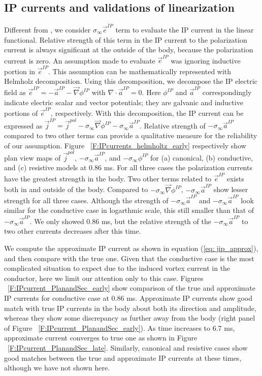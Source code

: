 \documentclass[a4paper, 11pt]{article}
\renewcommand{\div}{\nabla\cdot}
\newcommand{\grad}{\vec \nabla}
\newcommand{\siginf}{\sigma_\infty}
\renewcommand {\j}  { {\vec j} }
\newcommand {\e}  { {\vec e} }
\begin{document}
\subsection{IP currents and validations of linearization}
Different from \cite{Smith1988a}, we consider $\siginf \e^{IP}$ term to evaluate the IP current in the linear functional. Relative strength of this term in the IP current to the polarization current is always significant at the outside of the body, because the polarization current is zero. 
An assumption made to evaluate $\e^{IP}$ was ignoring inductive portion in $\e^{IP}$. 
This assumption can be mathematically represented with Helmholz decomposition. 
Using this decomposition, we decompose the IP electric field as $\e^{IP} = - \vec{a}^{IP} -\grad \phi^{IP}$ with $\div \vec{a}^{IP} = 0$. Here $\phi^{IP}$ and $\vec{a}^{IP}$ correspondingly indicate electric scalar and vector potentials; they are galvanic and inductive portions of $\e^{IP}$, respectively. With this decomposition, the IP current can be expressed as $\j^{IP} = \j^{pol}-\siginf \grad \phi^{IP}-\siginf \vec{a}^{IP}$. Relative strength of $-\siginf \vec{a}^{IP}$ compared to two other terms can provide a qualitative measure for the reliability of our assumption. 
Figure ~\ref{F:IPcurrents_helmholtz_early} respectively show plan view maps of $\j^{pol}$, $-\siginf \vec{a}^{IP}$, and $-\siginf \phi^{IP}$ for (a) canonical, (b) conductive, and (c) resistive models at 0.86 ms.
For all three cases the polarization currents have the greatest strength in the body. 
Two other terms related to $\e^{IP}$ exists both in and outside of the body. 
Compared to $-\siginf \grad\phi^{IP}$, $-\siginf \vec{a}^{IP}$ show lesser strength for all three cases. 
Although the strength of $-\siginf \vec{a}^{IP}$ and  $-\siginf \vec{a}^{IP}$ look similar for the conductive case in logarthmic scale, this still smaller than that of $-\siginf \vec{a}^{IP}$.
We only showed 0.86 ms, but the relative strength of the $-\siginf \vec{a}^{IP}$ to two other currents decreases after this time.

We compute the approximate IP current as shown in equation (\ref{eq: jip_approx}), and then compare with the true one. Given that the conductive case is the most complicated situation to expect due to the induced vortex current in the conductor, here we limit our attention only to this case.
Figures ~\ref{F:IPcurrent_PlanandSec_early} show comparison of the true and approximate IP currents for conductive case at 0.86 ms. 
Approximate IP currents show good match with true IP currents in the body about both its direction and amplitude, whereas they show some discrepancy as further away from the body (right panel of Figure ~\ref{F:IPcurrent_PlanandSec_early}).
As time increases to 6.7 ms, approximate current converges to true one as shown in Figure ~\ref{F:IPcurrent_PlanandSec_late}. Similarly, canonical and resistive cases show good matches between the true and approximate IP currents at these times, although we have not shown here. 
\end{document}
